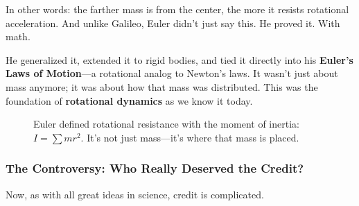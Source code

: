 In other words: the farther mass is from the center, the more it resists rotational acceleration. And unlike Galileo, Euler didn’t just say this. He proved it. With math. 

He generalized it, extended it to rigid bodies, and tied it directly into his \textbf{Euler’s Laws of Motion}—a rotational analog to Newton’s laws. It wasn’t just about mass anymore; it was about how that mass was distributed. This was the foundation of \textbf{rotational dynamics} as we know it today.


\begin{figure}[H]
\centering
{}
\caption{Euler defined rotational resistance with the moment of inertia: $I = \sum m r^2$. It’s not just mass—it’s where that mass is placed.}
\end{figure}



\subsubsection{The Controversy: Who Really Deserved the Credit?}

Now, as with all great ideas in science, credit is complicated.

